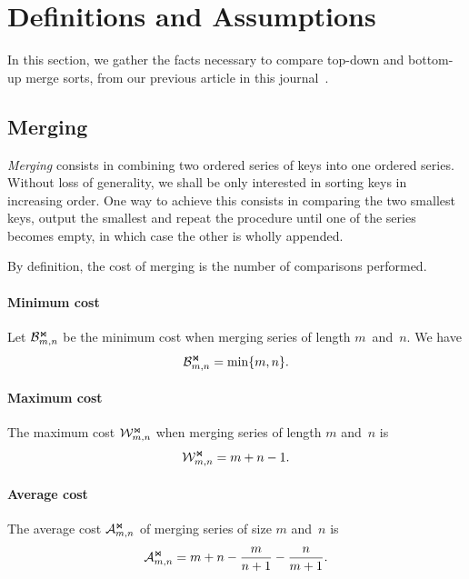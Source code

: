 \section{Definitions and Assumptions}

In this section, we gather the facts necessary to compare top-down and
bottom-up merge sorts, from our previous article in this
journal~\cite{Rinderknecht_2013}.

\subsection{Merging}

\emph{Merging} consists in combining two ordered series of keys into
one ordered series. Without loss of generality, we shall be only
interested in sorting keys in increasing order. One way to achieve
this consists in comparing the two smallest keys, output the smallest
and repeat the procedure until one of the series becomes empty, in
which case the other is wholly appended. 

By definition, the cost of merging is the number of comparisons
performed.

\paragraph{Minimum cost}
\label{merge:best_case}

Let \(\mathcal{B}_{m,n}^{\Join}\) be the minimum cost when merging series of
length \(m\)~and~\(n\). We have
\begin{equation}
\mathcal{B}_{m,n}^{\Join} = \min\{m,n\}.\label{eq:best_merge}
\end{equation}

\paragraph{Maximum cost}

The maximum cost \(\mathcal{W}_{m,n}^{\Join}\) when merging series of length
\(m\) and~\(n\) is
\begin{equation}
\mathcal{W}_{m,n}^{\Join} = m + n - 1.\label{eq:worst_merge}
\end{equation}

\paragraph{Average cost}

The average cost \(\mathcal{A}_{m,n}^{\Join}\) of merging series of size \(m\)
and~\(n\) is
\begin{equation}
\mathcal{A}_{m,n}^{\Join} = m + n - \frac{m}{n+1} - \frac{n}{m+1}.
\label{eq:mean_merge}
\end{equation}

